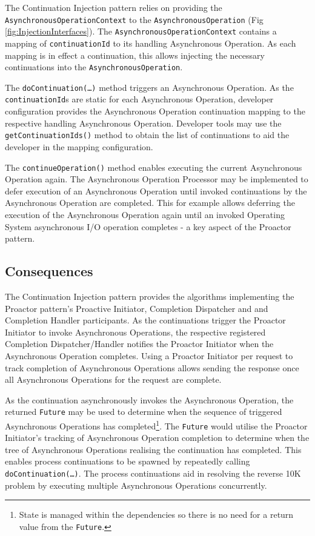 \documentclass[prodmode]{style/acmlarge}
\begin{document}
The Continuation Injection pattern relies on providing the
\texttt{AsynchronousOperationContext} to the \texttt{AsynchronousOperation} (Fig
\ref{fig:InjectionInterfaces}).  The \texttt{AsynchronousOperationContext}
contains a mapping of \texttt{continuationId} to its handling Asynchronous
Operation.  As each mapping is in effect a continuation, this allows injecting
the necessary continuations into the \texttt{AsynchronousOperation}.

The \texttt{doContinuation(\ldots)} method triggers an Asynchronous Operation.
As the \texttt{continuationId}s are static for each Asynchronous Operation,
developer configuration provides the Asynchronous Operation continuation mapping
to the respective handling Asynchronous Operation.  Developer tools may use the
\texttt{getContinuationIds()} method to obtain the list of continuations to aid
the developer in the mapping configuration.

The \texttt{continueOperation()} method enables executing the current
Asynchronous Operation again.  The Asynchronous Operation Processor may be
implemented to defer execution of an Asynchronous Operation until invoked
continuations by the Asynchronous Operation are completed.  This for example
allows deferring the execution of the Asynchronous Operation again until an
invoked Operating System asynchronous I/O operation completes - a key aspect of
the Proactor pattern.


\subsection{Consequences}

The Continuation Injection pattern provides the algorithms implementing the
Proactor pattern's Proactive Initiator, Completion Dispatcher and and Completion
Handler participants.  As the continuations trigger the Proactor Initiator to
invoke Asynchronous Operations, the respective registered Completion
Dispatcher/Handler notifies the Proactor Initiator when the Asynchronous
Operation completes.  Using a Proactor Initiator per request to track completion
of Asynchronous Operations allows sending the response once all Asynchronous
Operations for the request are complete.

As the continuation asynchronously invokes the Asynchronous Operation, the
returned \texttt{Future} may be used to determine when the sequence of triggered
Asynchronous Operations has completed\footnote{State is managed within the
dependencies so there is no need for a return value from the \texttt{Future}.}.
The \texttt{Future} would utilise the Proactor Initiator's tracking of
Asynchronous Operation completion to determine when the tree of Asynchronous
Operations realising the continuation has completed.  This enables process
continuations \cite{process-continuation} to be spawned by repeatedly calling
\texttt{doContinuation(\ldots)}.  The process continuations aid in resolving the
reverse 10K problem \cite{reverse-ten-k-problem} by executing multiple
Asynchronous Operations concurrently.
\end{document}
